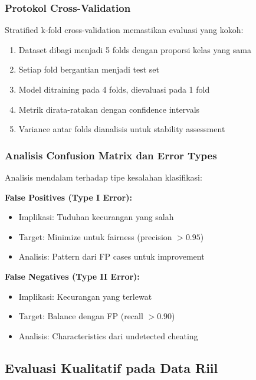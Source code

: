 \subsubsection{Protokol Cross-Validation}
\label{sec:protokolCV}

Stratified k-fold cross-validation memastikan evaluasi yang kokoh:

\begin{enumerate}
    \item Dataset dibagi menjadi 5 folds dengan proporsi kelas yang sama
    \item Setiap fold bergantian menjadi test set
    \item Model ditraining pada 4 folds, dievaluasi pada 1 fold
    \item Metrik dirata-ratakan dengan confidence intervals
    \item Variance antar folds dianalisis untuk stability assessment
\end{enumerate}

\subsubsection{Analisis Confusion Matrix dan Error Types}
\label{sec:confusionMatrixAnalysis}

Analisis mendalam terhadap tipe kesalahan klasifikasi:

\textbf{False Positives (Type I Error):}
\begin{itemize}
    \item Implikasi: Tuduhan kecurangan yang salah
    \item Target: Minimize untuk fairness (precision $> 0.95$)
    \item Analisis: Pattern dari FP cases untuk improvement
\end{itemize}

\textbf{False Negatives (Type II Error):}
\begin{itemize}
    \item Implikasi: Kecurangan yang terlewat
    \item Target: Balance dengan FP (recall $> 0.90$)
    \item Analisis: Characteristics dari undetected cheating
\end{itemize}

\subsection{Evaluasi Kualitatif pada Data Riil}
\label{sec:evaluasiKualitatif}

